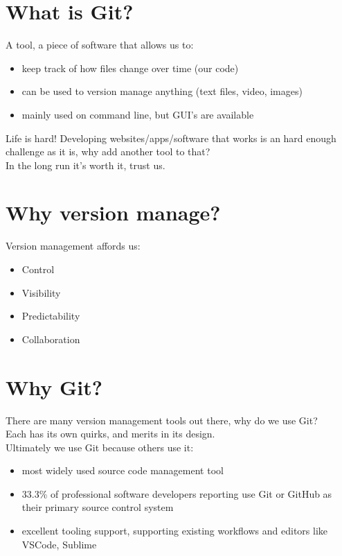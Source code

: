 
\section{What is Git?}

A tool, a piece of software that allows us to:

\begin{itemize}
    \item keep track of how files change over time (our code)
    \item can be used to version manage anything (text files, video, images)
    \item mainly used on command line, but GUI's are available
\end{itemize}

\begin{infobox}{Life is hard!}
    Developing websites/apps/software that works is an hard enough challenge as it is, why add another tool to that?
    \\
    In the long run it's worth it, trust us.
\end{infobox}

\section{Why version manage?}

Version management affords us:

\begin{itemize}
    \item Control
    \item Visibility
    \item Predictability
    \item Collaboration
\end{itemize}

\section{Why Git?}

There are many version management tools out there, why do we use Git?
\\

Each has its own quirks, and merits in its design.
\\

Ultimately we use Git because others use it:

\begin{itemize}
    \item most widely used source code management tool
	\item 33.3\% of professional software developers reporting use Git or GitHub as their primary source control system
	\item excellent tooling support, supporting existing workflows and editors like VSCode, Sublime
\end{itemize}
